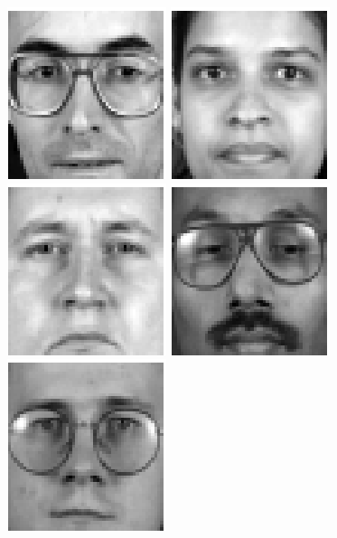 \begin{figure}
\begin{center}
\includegraphics[scale=0.12]{ch4/figures/XM2VTS_21.png}
\includegraphics[scale=0.12]{ch4/figures/XM2VTS_22.png}
\includegraphics[scale=0.12]{ch4/figures/XM2VTS_23.png}
\includegraphics[scale=0.12]{ch4/figures/XM2VTS_24.png}\\
\includegraphics[scale=0.12]{ch4/figures/XM2VTS_25.png}

\end{center}
\end{figure}
